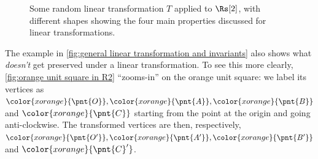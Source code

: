 \begin{figure}
	\begin{center}
	\end{center}
	\caption{Some random linear transformation $T$ applied to $\Rs[2]$, with different shapes showing the four main properties discussed for linear transformations.}
	\label{fig:general linear transformation and invariants}
\end{figure}

The example in \autoref{fig:general linear transformation and invariants} also shows what \textit{doesn't} get preserved under a linear transformation. To see this more clearly, \autoref{fig:orange unit square in R2}  \enquote{zooms-in} on the orange unit square: we label its vertices as $\color{xorange}{\pnt{O}}, \color{xorange}{\pnt{A}}, \color{xorange}{\pnt{B}}$ and $\color{xorange}{\pnt{C}}$ starting from the point at the origin and going anti-clockwise. The transformed vertices are then, respectively, $\color{xorange}{\pnt{O'}}, \color{xorange}{\pnt{A'}}, \color{xorange}{\pnt{B'}}$ and $\color{xorange}{\pnt{C}'}$.

